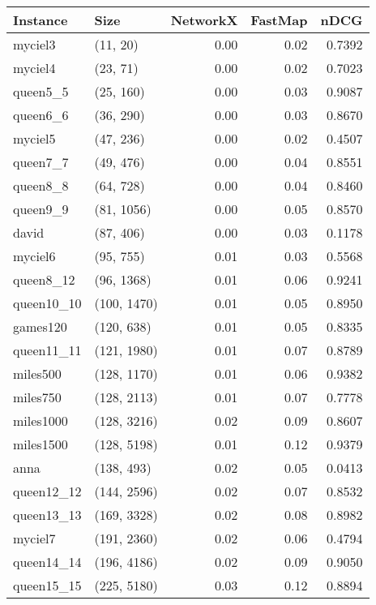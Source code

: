 \begin{tabular}{llrrr}
\toprule
  Instance &         Size &  NetworkX &  FastMap &   nDCG \\
\midrule
   myciel3 &     (11, 20) &      0.00 &     0.02 & 0.7392 \\
   myciel4 &     (23, 71) &      0.00 &     0.02 & 0.7023 \\
  queen5\_5 &    (25, 160) &      0.00 &     0.03 & 0.9087 \\
  queen6\_6 &    (36, 290) &      0.00 &     0.03 & 0.8670 \\
   myciel5 &    (47, 236) &      0.00 &     0.02 & 0.4507 \\
  queen7\_7 &    (49, 476) &      0.00 &     0.04 & 0.8551 \\
  queen8\_8 &    (64, 728) &      0.00 &     0.04 & 0.8460 \\
  queen9\_9 &   (81, 1056) &      0.00 &     0.05 & 0.8570 \\
     david &    (87, 406) &      0.00 &     0.03 & 0.1178 \\
   myciel6 &    (95, 755) &      0.01 &     0.03 & 0.5568 \\
 queen8\_12 &   (96, 1368) &      0.01 &     0.06 & 0.9241 \\
queen10\_10 &  (100, 1470) &      0.01 &     0.05 & 0.8950 \\
  games120 &   (120, 638) &      0.01 &     0.05 & 0.8335 \\
queen11\_11 &  (121, 1980) &      0.01 &     0.07 & 0.8789 \\
  miles500 &  (128, 1170) &      0.01 &     0.06 & 0.9382 \\
  miles750 &  (128, 2113) &      0.01 &     0.07 & 0.7778 \\
 miles1000 &  (128, 3216) &      0.02 &     0.09 & 0.8607 \\
 miles1500 &  (128, 5198) &      0.01 &     0.12 & 0.9379 \\
      anna &   (138, 493) &      0.02 &     0.05 & 0.0413 \\
queen12\_12 &  (144, 2596) &      0.02 &     0.07 & 0.8532 \\
queen13\_13 &  (169, 3328) &      0.02 &     0.08 & 0.8982 \\
   myciel7 &  (191, 2360) &      0.02 &     0.06 & 0.4794 \\
queen14\_14 &  (196, 4186) &      0.02 &     0.09 & 0.9050 \\
queen15\_15 &  (225, 5180) &      0.03 &     0.12 & 0.8894 \\

\end{tabular}
